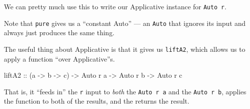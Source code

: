 \documentclass[]{article}
\newenvironment{Shaded}{}{}
\newcommand{\KeywordTok}[1]{\textcolor[rgb]{0.00,0.44,0.13}{\textbf{{#1}}}}
\newcommand{\DataTypeTok}[1]{\textcolor[rgb]{0.56,0.13,0.00}{{#1}}}
\newcommand{\CommentTok}[1]{\textcolor[rgb]{0.38,0.63,0.69}{\textit{{#1}}}}
\newcommand{\OtherTok}[1]{\textcolor[rgb]{0.00,0.44,0.13}{{#1}}}
\newcommand{\FunctionTok}[1]{\textcolor[rgb]{0.02,0.16,0.49}{{#1}}}
\newcommand{\NormalTok}[1]{{#1}}
\begin{document}
We can pretty much use this to write our Applicative instance for
\texttt{Auto\ r}.

\begin{Shaded}
\end{Shaded}

Note that \texttt{pure} gives us a ``constant Auto'' --- an
\texttt{Auto} that ignores its input and always just produces the same
thing.

The useful thing about Applicative is that it gives us \texttt{liftA2},
which allows us to apply a function ``over Applicative''s.

\begin{Shaded}
\begin{Highlighting}[]
\OtherTok{liftA2 ::} \NormalTok{(a }\OtherTok{->} \NormalTok{b }\OtherTok{->} \NormalTok{c) }\OtherTok{->} \DataTypeTok{Auto} \NormalTok{r a }\OtherTok{->} \DataTypeTok{Auto} \NormalTok{r b }\OtherTok{->} \DataTypeTok{Auto} \NormalTok{r c}
\end{Highlighting}
\end{Shaded}

That is, it ``feeds in'' the \texttt{r} input to \emph{both} the
\texttt{Auto\ r\ a} and the \texttt{Auto\ r\ b}, applies the function to
both of the results, and the returns the result.
\end{document}
